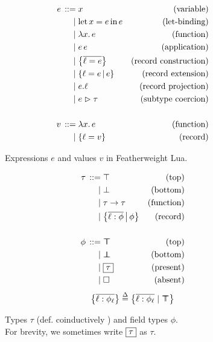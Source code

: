 \begin{subfigure}{.49\textwidth}
\begin{align*}
    \graintro e
    x 
    & \text{(variable)}
    \graitem
    \fllet{x}{e}e
    & \text{(let-binding)}
    \graitem
    \fllam{x} e
    & \text{(function)}
    \graitem
    e\,e
    & \text{(application)}        
    \graitem
    \flrec{\overline{\ell = e}}
    & \text{(record construction)}
    \graitem
    \flext{\ell = e}{e}
    & \text{(record extension)}
    \graitem
    \flproj{e}{\ell}
    & \text{(record projection)}
    \graitem
    \flcast{e}{\tau}
    & \text{(subtype coercion)}
    \\ \\
    \graintro v
    \fllam{x} e
    & \text{(function)}
    \graitem
    \flrec{\ell = v}
    & \text{(record)}
\end{align*}
\caption{Expressions $e$ and values $v$ in Featherweight Lua. \\ \phantom{|}}
\label{fig:featherweight-lua-expr}
\end{subfigure}
\hfill
\begin{subfigure}{.49\textwidth}
\begin{align*}
    \graintro \tau
    \top
    & \text{(top)}
    \graitem
    \bot
    & \text{(bottom)}
    \graitem
    \tau \to \tau
    & \text{(function)}
    \graitem
    \flext{\overline{\ell : \phi}}{\phi}
    & \text{(record)}
    \\ \\ 
    \graintro \phi 
    \flftop
    & \text{(top)}
    \graitem
    \flfbot 
    & \text{(bottom)}
    \graitem
    \flpresent \tau
    & \text{(present)}
    \graitem
    \flabsent 
    & \text{(absent)}
\end{align*}
$$ \flrec{ \overline{\ell : \phi_\ell} } \defeq \flrec{ \overline{\ell : \phi_\ell} \mid \flftop } $$
\caption{Types $\tau$ (def. coinductively \cite{castagna-polymorphic-variants}) and field types $\phi$. \\ For brevity, we sometimes write $\boxed{\tau}$ as $\tau$.}
\label{fig:featherweight-lua-types}
\end{subfigure}
